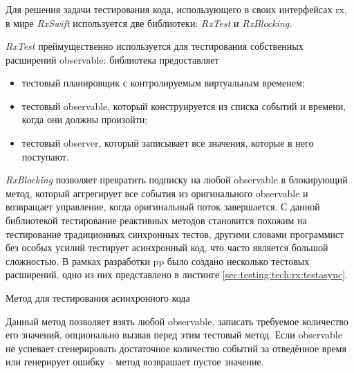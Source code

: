 \subsubsection{}
\label{sec:testing:tech:rx}

Для решения задачи тестирования кода, использующего в своих интерфейсах \gls{rx}, в мире \textit{RxSwift} используется две библиотеки: \textit{RxTest} и \textit{RxBlocking}.

\textit{RxTest} преймущественно используется для тестирования собственных расширений \gls{observable}: библиотека предоставляет

\begin{itemize}
	\item тестовый планировщик с контролируемым виртуальным временем;
	\item тестовый \gls{observable}, который конструируется из списка событий и времени, когда они должны произойти;
	\item тестовый \gls{observer}, который записывает все значения, которые в него поступают.
\end{itemize}

\textit{RxBlocking} позволяет превратить подписку на любой \gls{observable} в блокирующий метод, который аггрегирует все события из оригинального \gls{observable} и возвращает управление, когда оригинальный поток завершается. С данной библиотекой тестирование реактивных методов становится похожим на тестирование традиционных синхронных тестов, другими словами программист без особых усилий тестирует асинхронный код, что часто является большой сложностью. В рамках разработки \gls{pp} было создано несколько тестовых расширений, одно из них представлено в листинге \ref{sec:testing:tech:rx:testasync}.

\begin{code}[h!]
  
   \caption{Метод для тестирования асинхронного кода}
   \label{sec:testing:tech:rx:testasync}
\end{code}

Данный метод позволяет взять любой \gls{observable}, записать требуемое количество его значений, опционально вызвав перед этим тестовый метод. Если \gls{observable} не успевает сгенерировать достаточное количество событий за отведённое время или генерирует ошибку -- метод возврашает пустое значение.
